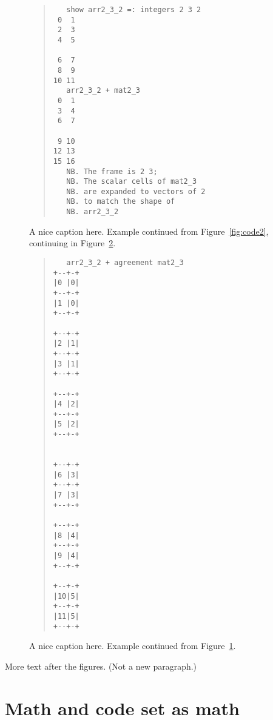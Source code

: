 %
\begin{figure}[p]
\begin{quote}
\begin{singlespacing}
\begin{small}
\begin{verbatim}
   show arr2_3_2 =: integers 2 3 2
 0  1
 2  3
 4  5

 6  7
 8  9
10 11
   arr2_3_2 + mat2_3
 0  1
 3  4
 6  7

 9 10
12 13
15 16
   NB. The frame is 2 3;
   NB. The scalar cells of mat2_3
   NB. are expanded to vectors of 2
   NB. to match the shape of
   NB. arr2_3_2
\end{verbatim}
\end{small}
\end{singlespacing}
\end{quote}
\caption{A nice caption here.  
Example continued from Figure~\ref{fig:code2},
continuing in Figure~\ref{fig:code4}.}
\label{fig:code3}
\end{figure}
%
\begin{figure}[p]
\begin{quote}
\begin{singlespacing}
\begin{small}
\begin{verbatim}
   arr2_3_2 + agreement mat2_3
+--+-+
|0 |0|
+--+-+
|1 |0|
+--+-+

+--+-+
|2 |1|
+--+-+
|3 |1|
+--+-+

+--+-+
|4 |2|
+--+-+
|5 |2|
+--+-+


+--+-+
|6 |3|
+--+-+
|7 |3|
+--+-+

+--+-+
|8 |4|
+--+-+
|9 |4|
+--+-+

+--+-+
|10|5|
+--+-+
|11|5|
+--+-+
\end{verbatim}
\end{small}
\end{singlespacing}
\end{quote}
\caption{A nice caption here.  
Example continued from Figure~\ref{fig:code3}.}
\label{fig:code4}
\end{figure}
%
More text after the figures.  (Not a new paragraph.)

\section{Math and code set as math}

